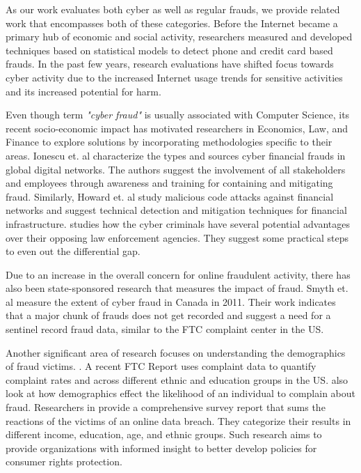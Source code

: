 \documentclass[conference]{IEEEtran}
\begin{document}
As our work evaluates both cyber as well as regular frauds, we provide related work that encompasses both of these categories. Before the Internet became a primary hub of economic and social activity, researchers measured \cite{clarke2001controlling} and developed techniques based on statistical models \cite{brause1999neural, moreau1997detection, bolton2002statistical} to detect phone and credit card based frauds. In the past few years,  research evaluations have shifted focus towards cyber activity \cite{ablon2016consumer, piper2002, ionescu2011fraud, howard2007cyber, snyder2015no} due to the increased Internet usage trends for sensitive activities and its increased potential for harm.

Even though term \emph{"cyber fraud"} is usually associated with Computer Science, its recent socio-economic impact has motivated researchers in Economics, Law, and Finance to explore solutions by incorporating methodologies specific to their areas. Ionescu et. al \cite{ionescu2011fraud} characterize the types and sources cyber financial frauds in global digital networks. The authors suggest the involvement of all stakeholders and employees through awareness and training for containing and mitigating fraud. Similarly, Howard et. al \cite{howard2007cyber} study malicious code attacks against financial networks and suggest technical detection and mitigation techniques for financial infrastructure. \cite{piper2002} studies how the cyber criminals have several potential advantages over their opposing law enforcement agencies. They suggest some practical steps to even out the differential gap.

Due to an increase in the overall concern for online fraudulent activity, there has also been state-sponsored research that measures the impact of fraud. Smyth et. al \cite{smyth2011measuring} measure the extent of cyber fraud in Canada in 2011. Their work indicates that a major chunk of frauds does not get recorded and suggest a need for a sentinel record fraud data, similar to the FTC complaint center in the US.

Another significant area of research focuses on understanding the demographics of fraud victims. \cite{JOCA:JOCA1}. A recent FTC Report \cite{raval2016determines} uses complaint data to quantify complaint rates and across different ethnic and education groups in the US. \cite{garrett2010consumers} also look at how demographics effect the likelihood of an individual to complain about fraud. Researchers in \cite{ablon2016consumer} provide a comprehensive survey report that sums the reactions of the victims of an online data breach. They categorize their results in different income, education, age, and ethnic groups. Such research aims to provide organizations with informed insight to better develop policies for consumer rights protection.
\end{document}
